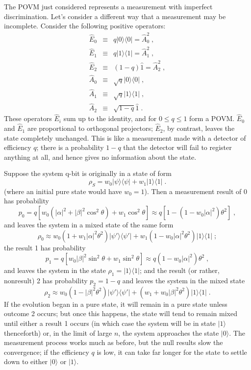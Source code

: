 \documentclass[12pt]{article}
\def\bra#1{{\langle #1 |}}
\def\ket#1{{| #1 \rangle}}
\def\id{{\hat 1}}
\def\E{{\hat E}}
\def\A{{\hat A}}
\begin{document}
The POVM just considered represents a measurement with imperfect
discrimination.  Let's consider a different way that a measurement may
be incomplete.  Consider the following positive operators:
\begin{eqnarray}
\E_0 &\equiv& q \ket0\bra0 = \A_0^2 \;, \nonumber\\
\E_1 &\equiv& q \ket1\bra1 = \A_1^2 \;, \nonumber\\
\E_2 &\equiv& (1-q) \id = \A_2^2 \;, \nonumber\\
\A_0 &\equiv& \sqrt{q} \ket0\bra0 \;, \nonumber\\
\A_1 &\equiv& \sqrt{q} \ket1\bra1 \;, \nonumber\\
\A_2 &\equiv& \sqrt{1-q} \id \;.
\end{eqnarray}
These operators $\E_i$ sum up to the identity, and for $0\le q\le1$
form a POVM.  $\E_0$ and $\E_1$ are
proportional to orthogonal projectors; $\E_2$, by contrast,
leaves the state completely unchanged.  This is like a measurement made
with a detector of efficiency $q$; there is a probability $1-q$ that
the detector will fail to register anything at all, and hence gives
no information about the state.

Suppose the system q-bit is originally in a state of form
\begin{equation}
\rho_S = w_0 \ket\psi\bra\psi + w_1 \ket1\bra1 \;.
\label{rho_sys}
\end{equation}
(where an initial pure state would have $w_0=1$).  Then a measurement result
of 0 has probability
\begin{equation}
p_0 = q \left[ w_0(|\alpha|^2+|\beta|^2\cos^2\theta)
  + w_1\cos^2\theta \right] \approx q[1 - (1-w_0|\alpha|^2)\theta^2] \;,
\end{equation}
and leaves the system in a mixed state of the same form
\begin{equation}
\rho_0 \approx w_0(1+w_1|\alpha|^2\theta^2)\ket{\psi'}\bra{\psi'}
  + w_1(1-w_0|\alpha|^2\theta^2) \ket1\bra1 \;;
\end{equation}
the result 1 has probability
\begin{equation}
p_1 = q \left[ w_0|\beta|^2\sin^2\theta + w_1\sin^2\theta \right]
  \approx q (1-w_0|\alpha|^2)\theta^2 \;,
\end{equation}
and leaves the system in the state $\rho_1 = \ket1\bra1$; and the result
(or rather, nonresult) 2 has probability $p_2 = 1-q$ and leaves the
system in the mixed state
\begin{equation}
\rho_2 \approx w_0(1-|\beta|^2\theta^2)\ket{\psi'}\bra{\psi'}
  + (w_1 + w_0|\beta|^2\theta^2)\ket1\bra1 \;.
\end{equation}
If the evolution began in a pure state, it will remain in a pure state
unless outcome 2 occurs; but once this happens, the state will tend to
remain mixed until either a result 1 occurs (in which case the system
will be in state $\ket1$ thenceforth) or, in the limit of large $n$,
the system approaches the state $\ket0$.  The measurement process works
much as before, but the null results slow the convergence; if the efficiency
$q$ is low, it can take far longer for the state to settle down to
either $\ket0$ or $\ket1$.
\end{document}
